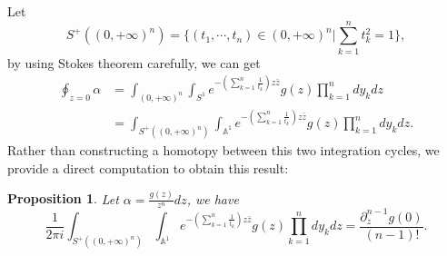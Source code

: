 \documentclass[11pt]{amsart}
\newtheorem{prop}[thm]{Proposition}
\theoremstyle{definition}
\theoremstyle{remark}
\numberwithin{equation}{section}
\begin{document}
Let 
$$
S^{+}((0,+\infty)^n)=\{(t_{1},\cdots,t_{n})\in(0,+\infty)^{n}|\sum_{k=1}^{n}t_{k}^{2}=1\},
$$
by using Stokes theorem carefully, we can get 
\begin{align*}
\oint_{z=0}\alpha
&=\int_{(0,+\infty)^{n}}\int_{S^{1}}e^{-\left(\sum_{k=1}^{n}\frac{1}{t_{k}}\right)z\bar{z}}g(z)\prod_{k=1}^{n}dy_{k}dz\\
&=\int_{S^{+}((0,+\infty)^n)}\int_{\mathbb{A}^{1}}e^{-\left(\sum_{k=1}^{n}\frac{1}{t_{k}}\right)z\bar{z}}g(z)\prod_{k=1}^{n}dy_{k}dz.
\end{align*}
Rather than constructing a homotopy between this two integration cycles, we provide a direct computation to obtain this result:
\begin{prop}
    Let $\alpha=\frac{g(z)}{z^{n}}dz$, we have
    $$
    \frac{1}{2\pi i}\int_{S^{+}((0,+\infty)^n)}\int_{\mathbb{A}^{1}}e^{-\left(\sum_{k=1}^{n}\frac{1}{t_{k}}\right)z\bar{z}}g(z)\prod_{k=1}^{n}dy_{k}dz=\frac{\partial_{z}^{n-1}g(0)}{(n-1)!}.
    $$
\end{prop}
\end{document}
